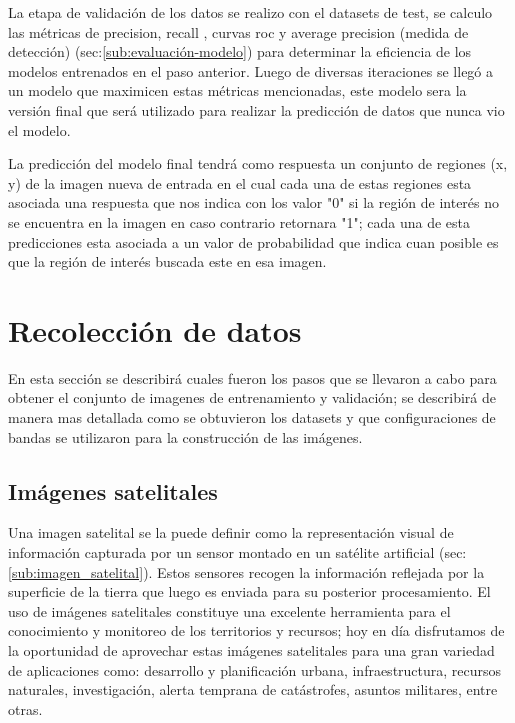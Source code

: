La etapa de validación de los datos se realizo con el datasets de test, se calculo las métricas de precision, recall , curvas roc y average precision (medida de detección) (sec:\ref{sub:evaluación-modelo}) para determinar la eficiencia de los  modelos entrenados en el paso anterior. Luego de diversas iteraciones se llegó a un modelo que maximicen estas métricas mencionadas, este modelo sera la versión final que será utilizado para realizar la predicción de datos que nunca vio el modelo.

La predicción del modelo final tendrá como respuesta un conjunto de regiones (x, y) de la imagen nueva de entrada en el cual cada una de estas regiones esta asociada una respuesta que nos indica con los valor "0" si la región de interés no se encuentra en la imagen en caso contrario  retornara "1"; cada una de esta predicciones esta asociada a un valor de probabilidad que indica cuan posible es que la región de interés buscada este en esa imagen.

\section{Recolección de datos}\label{sec:recoleccion}

En esta sección se describirá  cuales fueron los pasos que se llevaron a cabo para obtener el conjunto de imagenes de entrenamiento y validación; se   describirá de manera mas detallada como se obtuvieron los datasets y que configuraciones de bandas se utilizaron para la construcción de las imágenes.


\subsection{Imágenes satelitales}\label{sub:nivelesdeprocesamiento}

Una imagen satelital se la puede definir como la representación visual de información capturada por un sensor montado en un satélite artificial (sec:\ref{sub:imagen_satelital}). Estos sensores recogen la información reflejada por la superficie de la tierra que luego es enviada para su posterior procesamiento. El uso de imágenes satelitales constituye una excelente herramienta para el conocimiento y monitoreo de los territorios y recursos; hoy en día disfrutamos de la oportunidad de aprovechar estas imágenes satelitales para una gran variedad de aplicaciones como: desarrollo y planificación urbana, infraestructura, recursos naturales, investigación, alerta temprana de catástrofes, asuntos militares, entre otras.

